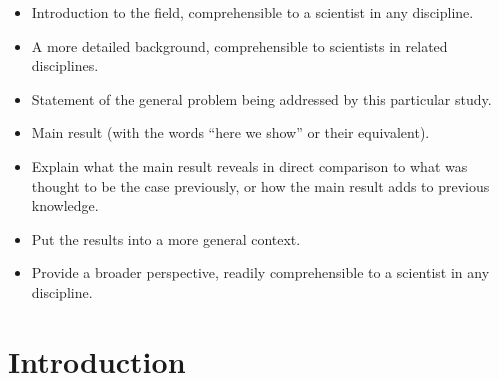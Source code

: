 \documentclass[%
nonumbib,      %
%
]{nrc1}                          %
\begin{document}
\begin{itemize}
 \item Introduction to the field, comprehensible to a scientist in any discipline.
 \item A more detailed background, comprehensible to scientists in related disciplines.
 \item Statement of the general problem being addressed by this particular study.
 \item Main result (with the words “here we show” or their equivalent).
 \item Explain what the main result reveals in direct comparison to what was thought to be the case previously, or how the main result adds to previous knowledge.
 \item Put the results into a more general context.
 \item Provide a broader perspective, readily comprehensible to a scientist in any discipline.
\end{itemize}

\newpage


\section*{Introduction}
\end{document}
